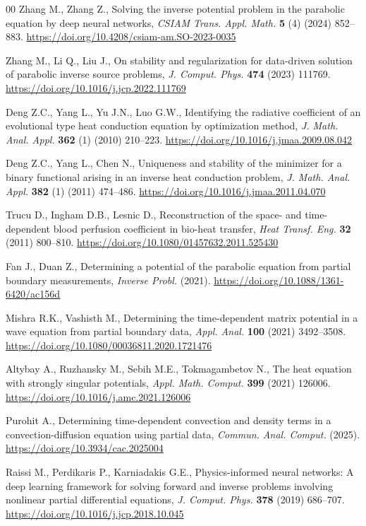 \documentclass[reqno]{amsart}
\begin{document}
\begin{thebibliography}{00}
Zhang M., Zhang Z., Solving the inverse potential problem in the parabolic equation by deep neural networks, \textit{CSIAM Trans. Appl. Math.} \textbf{5} (4) (2024) 852--883. \url{https://doi.org/10.4208/csiam-am.SO-2023-0035}

Zhang M., Li Q., Liu J., On stability and regularization for data-driven solution of parabolic inverse source problems, \textit{J. Comput. Phys.} \textbf{474} (2023) 111769. \url{https://doi.org/10.1016/j.jcp.2022.111769}

Deng Z.C., Yang L., Yu J.N., Luo G.W., Identifying the radiative coefficient of an evolutional type heat conduction equation by optimization method,  \textit{J. Math. Anal. Appl.} \textbf{362} (1) (2010) 210--223. \url{https://doi.org/10.1016/j.jmaa.2009.08.042}

Deng Z.C., Yang L., Chen N., Uniqueness and stability of the minimizer for a binary functional arising in an inverse heat conduction problem, \textit{J. Math. Anal. Appl.} \textbf{382} (1) (2011) 474--486. \url{https://doi.org/10.1016/j.jmaa.2011.04.070}

Trucu D., Ingham D.B., Lesnic D., Reconstruction of the space- and time-dependent blood perfusion coefficient in bio-heat transfer, \textit{Heat Transf. Eng.} \textbf{32} (2011) 800--810. \url{https://doi.org/10.1080/01457632.2011.525430}

Fan J., Duan Z., Determining a potential of the parabolic equation from partial boundary measurements, \textit{Inverse Probl.} (2021). \url{https://doi.org/10.1088/1361-6420/ac156d}

Mishra R.K., Vashisth M., Determining the time-dependent matrix potential in a wave equation from partial boundary data, \textit{Appl. Anal.} \textbf{100} (2021) 3492--3508. \url{https://doi.org/10.1080/00036811.2020.1721476}

Altybay A., Ruzhansky M., Sebih M.E., Tokmagambetov N., The heat equation with strongly singular potentials, \textit{Appl. Math. Comput.} \textbf{399} (2021) 126006. \url{https://doi.org/10.1016/j.amc.2021.126006}

Purohit A., Determining time-dependent convection and density terms in a convection-diffusion equation using partial data, \textit{Commun. Anal. Comput.} (2025). \url{https://doi.org/10.3934/cac.2025004}

Raissi M., Perdikaris P., Karniadakis G.E., Physics-informed neural networks: A deep learning framework for solving forward and inverse problems involving nonlinear partial differential equations, \textit{J. Comput. Phys.} \textbf{378} (2019) 686--707. \url{https://doi.org/10.1016/j.jcp.2018.10.045}


\end{thebibliography}
\end{document}
